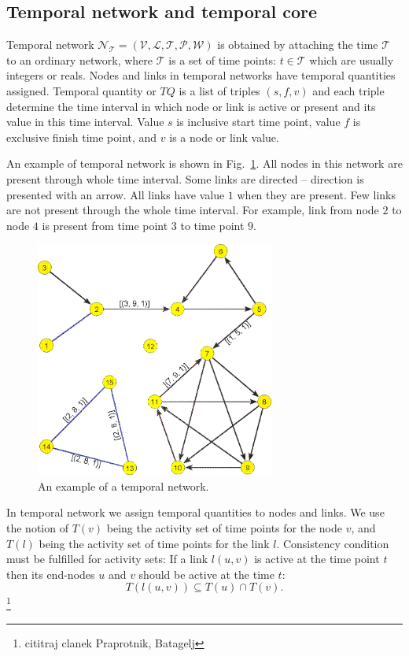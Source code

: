 \documentclass[a4paper,twoside,10pt]{article}
\begin{document}
\subsection{Temporal network and temporal core}\label{temporal}

Temporal network $\mathcal{N_T} = (\mathcal{V}, \mathcal{L}, \mathcal{T}, \mathcal{P}, \mathcal{W})$ is obtained by attaching the time $\mathcal{T}$ to an ordinary network, where $\mathcal{T}$ is a set of time points: $t \in \mathcal{T}$ which are usually integers or reals. Nodes and links in temporal networks have temporal quantities assigned. Temporal quantity or $TQ$ is a list of triples $(s, f, v)$ and each triple determine the time interval in which node or link is active or present and its value in this time interval. Value $s$ is inclusive start time point, value $f$ is exclusive finish time point, and $v$ is a node or link value.

An example of temporal network is shown in Fig.~\ref{example}. All nodes in this network are present through whole time interval. Some links are directed -- direction is presented with an arrow. All links have value $1$ when they are present. Few links are not present through the whole time interval. For example, link from node $2$ to node $4$ is present from time point $3$ to time point $9$.

\begin{figure}[!h]
	\centering
  \includegraphics[width=0.7\textwidth]{./pics/Fig5.png}
  \caption{An example of a temporal network.}
  \label{example}
\end{figure}

In temporal network we assign temporal quantities to nodes and links. We use the notion of $T(v)$ being the activity set of time points for the node $v$, and $T(l)$ being the activity set of time points for the link $l$. Consistency condition must be fulfilled for activity sets: If a link $l(u, v)$ is active at the time point $t$ then its end-nodes $u$ and $v$ should be active at the time $t:$
$$T(l(u, v)) \subseteq T(u) \cap T(v).$$
\footnote{cititraj clanek Praprotnik, Batagelj}
\end{document}
